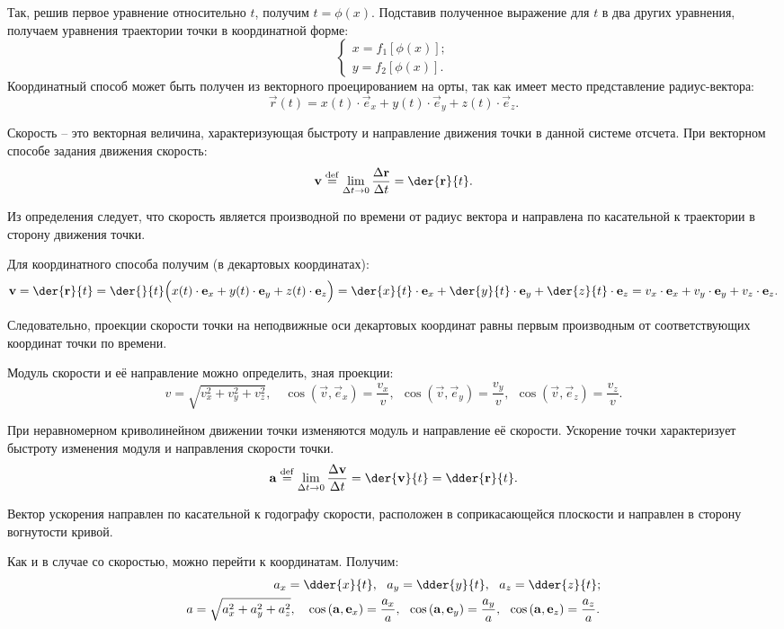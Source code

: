 Так, решив первое уравнение относительно \( t \), получим \( t = \phi(x) \).
Подставив полученное выражение для \( t \) в два других уравнения, получаем
уравнения траектории точки в координатной форме:
\[ \left\{ \begin{array}{l}
    x = f_1[\phi(x)]; \\
    y = f_2[\phi(x)].
\end{array} \right. \]
Координатный способ может быть получен из векторного проецированием на орты, так
как имеет место представление радиус-вектора:
\[
    \vec{r}(t) = x(t)\cdot\vec{e}_x + y(t)\cdot\vec{e}_y + z(t)\cdot\vec{e}_z.
\]


Скорость -- это векторная величина, характеризующая быстроту и направление
движения точки в данной системе отсчета. При векторном способе задания движения
скорость:
\[
    \vec{v} \defeq \lim_{\D t \to 0} \Der{\vec{r}}{t} = \der{\vec{r}}{t}.
\]

Из определения следует, что скорость является производной по времени от радиус
вектора и направлена по касательной к траектории в сторону движения точки.

Для координатного способа получим (в декартовых координатах):
\[
    \vec{v} = \der{\vec{r}}{t} = \der{}{t}\Big(x(t)\cdot\vec{e}_x +
    y(t)\cdot\vec{e}_y + z(t)\cdot\vec{e}_z\Big) = \der{x}{t}\cdot\vec{e}_x +
    \der{y}{t}\cdot\vec{e}_y + \der{z}{t}\cdot\vec{e}_z = v_x\cdot\vec{e}_x +
    v_y\cdot\vec{e}_y + v_z\cdot\vec{e}_z.
\]

Следовательно, проекции скорости точки на неподвижные оси декартовых координат
равны первым производным от соответствующих координат точки по времени.

Модуль скорости и её направление можно определить, зная проекции:
\[
    v = \sqrt{v_x^2 + v_y^2 + v_z^2}, \quad
    \cos\left(\vec{v}, \vec{e}_x\right) = \frac{v_x}{v},\ \ 
    \cos\left(\vec{v}, \vec{e}_y\right) = \frac{v_y}{v},\ \ 
    \cos\left(\vec{v}, \vec{e}_z\right) = \frac{v_z}{v}.
\]


При неравномерном криволинейном движении точки изменяются модуль и направление
её скорости. Ускорение точки характеризует быстроту изменения модуля и
направления скорости точки.
\[
    \vec{a} \defeq \lim_{\D t \to 0} \Der{\vec{v}}{t} = \der{\vec{v}}{t} =
    \dder{\vec{r}}{t}.
\]

Вектор ускорения направлен по касательной к годографу скорости, расположен в
соприкасающейся плоскости и направлен в сторону вогнутости кривой.

Как и в случае со скоростью, можно перейти к координатам. Получим:
\begin{align*}
    a_x = \dder{x}{t},\ \ a_y & = \dder{y}{t},\ \ a_z = \dder{z}{t}; \\
    a = \sqrt{a_x^2 + a_y^2 + a_z^2}, \quad
    \cos\left(\vec{a}, \vec{e}_x\right) = \frac{a_x}{a}, & \ \ 
    \cos\left(\vec{a}, \vec{e}_y\right) = \frac{a_y}{a},\ \ 
    \cos\left(\vec{a}, \vec{e}_z\right) = \frac{a_z}{a}.
\end{align*}

\newpage %
